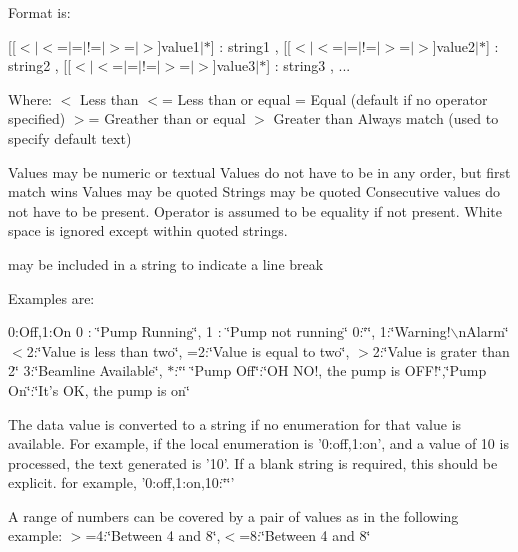 Format is:

\mbox{[}\mbox{[}$<$$|$$<$=$|$=$|$!=$|$$>$=$|$$>$\mbox{]}value1$|$$\ast$\mbox{]} : string1 , \mbox{[}\mbox{[}$<$$|$$<$=$|$=$|$!=$|$$>$=$|$$>$\mbox{]}value2$|$$\ast$\mbox{]} : string2 , \mbox{[}\mbox{[}$<$$|$$<$=$|$=$|$!=$|$$>$=$|$$>$\mbox{]}value3$|$$\ast$\mbox{]} : string3 , ...

Where: $<$ Less than $<$= Less than or equal = Equal (default if no operator specified) $>$= Greather than or equal $>$ Greater than Always match (used to specify default text)

Values may be numeric or textual Values do not have to be in any order, but first match wins Values may be quoted Strings may be quoted Consecutive values do not have to be present. Operator is assumed to be equality if not present. White space is ignored except within quoted strings. \par
 may be included in a string to indicate a line break

Examples are:

0:Off,1:On 0 : \char`\"{}Pump Running\char`\"{}, 1 : \char`\"{}Pump not running\char`\"{} 0:\char`\"{}\char`\"{}, 1:\char`\"{}Warning!$\backslash$nAlarm\char`\"{} $<$2:\char`\"{}Value is less than two\char`\"{}, =2:\char`\"{}Value is equal to two\char`\"{}, $>$2:\char`\"{}Value is grater than 2\char`\"{} 3:\char`\"{}Beamline Available\char`\"{}, $\ast$:\char`\"{}\char`\"{} \char`\"{}Pump Off\char`\"{}:\char`\"{}OH NO!, the pump is OFF!\char`\"{},\char`\"{}Pump On\char`\"{}:\char`\"{}It's OK, the pump is on\char`\"{}

The data value is converted to a string if no enumeration for that value is available. For example, if the local enumeration is '0:off,1:on', and a value of 10 is processed, the text generated is '10'. If a blank string is required, this should be explicit. for example, '0:off,1:on,10:\char`\"{}\char`\"{}'

A range of numbers can be covered by a pair of values as in the following example: $>$=4:\char`\"{}Between 4 and 8\char`\"{},$<$=8:\char`\"{}Between 4 and 8\char`\"{}


